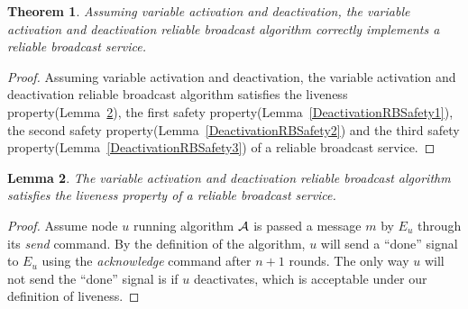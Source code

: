 \documentclass[english]{article}
\newtheorem{theorem}{Theorem}[section]
\newtheorem{lemma}[theorem]{Lemma}
\begin{document}
\begin{theorem}
\label{DeactivationReliableBroadcast}
Assuming variable activation and deactivation, the variable activation and deactivation reliable broadcast algorithm correctly implements a reliable broadcast service.
\end{theorem}
\begin{proof}
Assuming variable activation and deactivation, the variable activation and deactivation reliable broadcast algorithm satisfies the liveness property(Lemma~\ref{DeactivationRBLiveness}), 
the first safety property(Lemma~\ref{DeactivationRBSafety1}),
the second safety property(Lemma~\ref{DeactivationRBSafety2}) and 
the third safety property(Lemma~\ref{DeactivationRBSafety3}) of a reliable broadcast service.
\end{proof}

\begin{lemma}
\label{DeactivationRBLiveness}
The variable activation and deactivation reliable broadcast algorithm satisfies the liveness property of a reliable broadcast service.
\end{lemma}
\begin{proof}
Assume node $u$ running algorithm $\cal A$ is passed a message $m$ by $E_u$ through its \textit{send} command. By the definition of the algorithm, $u$ will send  a ``done'' signal to $E_u$ using the \textit{acknowledge} command after $n+1$ rounds. The only way $u$ will not send the ``done'' signal is if $u$ deactivates, which is acceptable under our definition of liveness.
\end{proof}
\end{document}
